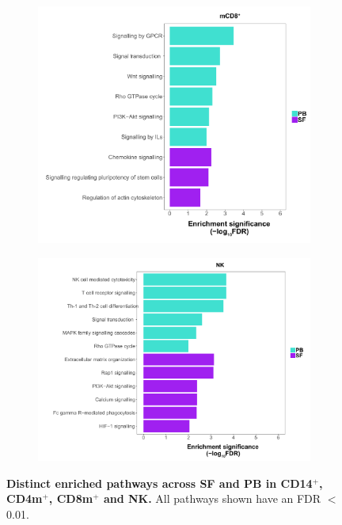 \begin{figure}[H]
\begin{subfigure}[b]{0.45\textwidth}
\centering
\includegraphics[width=\textwidth]{./Results3/pdfs/ATAC_PSA_CD8_pathways_barplot_all_DOCS_proximity}%
\caption{}
\end{subfigure}
\begin{subfigure}[b]{0.45\textwidth} 
\centering
\includegraphics[width=\textwidth]{./Results3/pdfs/ATAC_PSA_NK_pathways_barplot_all_DOCS_proximity}%
\caption{}
\end{subfigure}
\caption[Distinct enriched pathways across SF and PB in CD14$^+$,CD4m$^+$,CD8m$^+$ and NK.]{\textbf{Distinct enriched pathways across SF and PB in CD14$^+$, CD4m$^+$, CD8m$^+$ and NK.} All pathways shown have an FDR $<$0.01.}
\label{figure:PSA_ATAC_pathway_analysis_all_DOC}
\end{figure}


